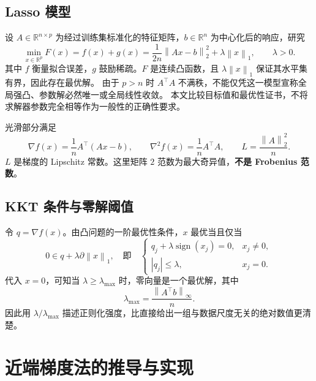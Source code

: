 \documentclass[UTF8,11pt,a4paper,fontset=fandol]{ctexart}
\newcommand{\R}{\mathbb{R}}
\newcommand{\norm}[1]{\left\|#1\right\|}
\begin{document}
\subsection{Lasso 模型}
设 $A\in\R^{n\times p}$ 为经过训练集标准化的特征矩阵，$b\in\R^n$ 为中心化后的响应，研究
\begin{equation}
 \min_{x\in\R^p} F(x)=f(x)+g(x)
 =\frac{1}{2n}\norm{Ax-b}_2^2+\lambda\norm{x}_1,\qquad \lambda>0.
 \label{eq:lasso}
\end{equation}
其中 $f$ 衡量拟合误差，$g$ 鼓励稀疏。$F$ 是连续凸函数，且 $\lambda\norm{x}_1$ 保证其水平集有界，因此存在最优解。
由于 $p>n$ 时 $A^\top A$ 不满秩，不能仅凭这一模型宣称全局强凸、参数解必然唯一或全局线性收敛。
本文比较目标值和最优性证书，不将求解器参数完全相等作为一般性的正确性要求。

光滑部分满足
\begin{equation}
 \nabla f(x)=\frac{1}{n}A^\top(Ax-b),\qquad
 \nabla^2 f(x)=\frac{1}{n}A^\top A,\qquad
 L=\frac{\norm{A}_2^2}{n}.
 \label{eq:gradient}
\end{equation}
$L$ 是梯度的 Lipschitz 常数。这里矩阵 $2$ 范数为最大奇异值，\textbf{不是 Frobenius 范数}。

\subsection{KKT 条件与零解阈值}
令 $q=\nabla f(x)$。由凸问题的一阶最优性条件，$x$ 最优当且仅当
\begin{equation}
 0\in q+\lambda\partial\norm{x}_1,
 \quad\text{即}\quad
 \begin{cases}
 q_j+\lambda\operatorname{sign}(x_j)=0,&x_j\ne0,\\
 |q_j|\le\lambda,&x_j=0.
 \end{cases}
 \label{eq:kkt}
\end{equation}
代入 $x=0$，可知当 $\lambda\ge\lambda_{\max}$ 时，零向量是一个最优解，其中
\begin{equation}
 \lambda_{\max}=\frac{\norm{A^\top b}_\infty}{n}.
 \label{eq:lambdamax}
\end{equation}
因此用 $\lambda/\lambda_{\max}$ 描述正则化强度，比直接给出一组与数据尺度无关的绝对数值更清楚。

\section{近端梯度法的推导与实现}
\end{document}
